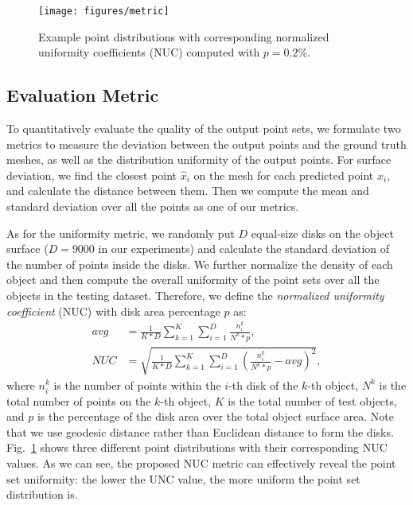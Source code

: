 \begin{figure}[!t]
	\centering
	\texttt{[image: figures/metric]}\vspace{1mm}
	\caption{Example point distributions with corresponding normalized uniformity coefficients (NUC) computed with $p=0.2\%$.}
	\label{fig:metric}\vspace{-2mm}
\end{figure}



\subsection{Evaluation Metric}
\label{sec:metric}

To quantitatively evaluate the quality of the output point sets, we formulate two metrics to measure the deviation between the output points and the ground truth meshes, as well as the distribution uniformity of the output points.
For surface deviation, we find the closest point $\hat{x}_i$ on the mesh for each predicted point $x_i$, and calculate the distance between them. 
Then we compute the mean and standard deviation over all the points as one of our metrics. 

As for the uniformity metric, we randomly put $D$ equal-size disks on the object surface ($D = 9000$ in our experiments) and calculate the standard deviation of the number of points inside the disks. We further normalize the density of each object and then compute the overall uniformity of the point sets over all the objects in the testing dataset.
Therefore, we define the \emph{normalized uniformity coefficient} (NUC) with disk area percentage $p$ as:
\begin{equation}
\begin{split}
avg &= \frac{1}{K*D}\sum_{k=1}^{K}\sum_{i=1}^{D}\frac{n_i^k}{N^k*p},\\
NUC &= \sqrt{\frac{1}{K*D}\sum_{k=1}^{K}\sum_{i=1}^{D}(\frac{n_i^k}{N^k*p}-avg)^2},
\end{split}
\end{equation}
where $n_i^k$ is the number of points within the $i$-th disk of the $k$-th object, $N^k$ is the total number of points on the $k$-th object, $K$ is the total number of test objects, and $p$ is the percentage of the disk area over the total object surface area. 
Note that we use geodesic distance rather than Euclidean distance to form the disks.
Fig.~\ref{fig:metric} shows three different point distributions with their corresponding NUC values.
As we can see, the proposed NUC metric can effectively reveal the point set uniformity: the lower the UNC value, the more uniform the point set distribution is.



